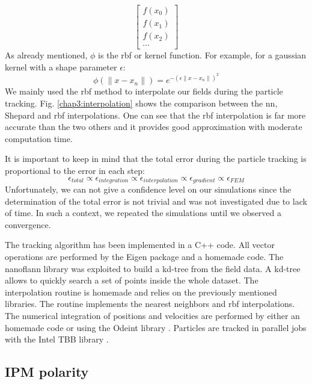 \begin{refsection}
\begin{equation}
\begin{bmatrix}
      f(x_{0}) \\
      f(x_{1}) \\
      f(x_{2}) \\
      \cdots
    \end{bmatrix}
  \end{equation}
  As already mentioned, $\phi$ is the \acrshort{rbf} or kernel function. For example, for a gaussian kernel with a shape parameter $\epsilon$:
  \begin{equation}
    \phi(\lVert x - x_{n}\rVert) = e^{-(\epsilon\lVert x - x_{n}\rVert)^{2}}
  \end{equation}
  We mainly used the \acrshort{rbf} method to interpolate our fields during the particle tracking. Fig. \ref{chap3:interpolation} shows the comparison between the \acrshort{nn}, Shepard and \acrshort{rbf} interpolations. One can see that the \acrshort{rbf} interpolation is far more accurate than the two others and it provides good approximation with moderate computation time.

  It is important to keep in mind that the total error during the particle tracking is proportional to the error in each step:
  \begin{equation}
    \epsilon_{total} \propto \epsilon_{integration}\propto\epsilon_{interpolation}\propto\epsilon_{gradient}\propto\epsilon_{FEM}
  \end{equation}
  Unfortunately, we can not give a confidence level on our simulations since the determination of the total error is not trivial and was not investigated due to lack of time. In such a context, we repeated the simulations until we observed a convergence.
  

  The tracking algorithm has been implemented in a C++ code. All vector operations are performed by the Eigen \cite{eigenweb} package and a homemade code. The nanoflann library \cite{blanco2014nanoflann} was exploited to build a kd-tree from the field data. A kd-tree allows to quickly search a set of points inside the whole dataset. The interpolation routine is homemade and relies on the previously mentioned libraries. The routine implements the nearest neighbors and \acrshort{rbf} interpolations. The numerical integration of positions and velocities are performed by either an homemade code or using the Odeint library \cite{Ahnert2011,Mulansky2014}. Particles are tracked in parallel jobs with the Intel TBB library \cite{tbb2019}.

  \subsection{IPM polarity}


\end{refsection}
